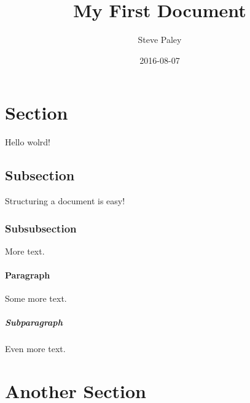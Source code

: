 \documentclass{article}
\title{My First Document}
\date{2016-08-07}
\author{Steve Paley}
\begin{document}
	\maketitle
	\newpage
	
	\section{Section}
	Hello wolrd!
	
	\subsection{Subsection}
	Structuring a document is easy!
	\subsubsection{Subsubsection}
	More text.
	
	\paragraph{Paragraph}
	Some more text.
	\subparagraph{Subparagraph}
	Even more text.
	
	\section{Another Section}
	
\end{document}
